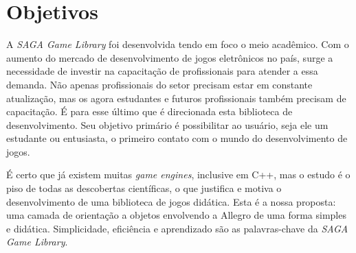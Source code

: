 \section{Objetivos}
\label{section:objetivos}
%
A \textit{SAGA Game Library} foi desenvolvida tendo em foco o meio acadêmico. Com o aumento do mercado de desenvolvimento de 
jogos eletrônicos no país, surge a necessidade de investir na capacitação de profissionais para atender a essa demanda. Não apenas profissionais do setor precisam estar em constante atualização, mas os agora estudantes e futuros profissionais também precisam de capacitação. É para esse último que é direcionada esta biblioteca de desenvolvimento. Seu objetivo primário é possibilitar ao usuário, seja ele um estudante ou entusiasta, o primeiro contato com o mundo do desenvolvimento de jogos.
%
\par
%
É certo que já existem muitas \textit{game engines}, inclusive em C++, mas o estudo é o piso de todas as descobertas científicas, o que justifica e motiva o desenvolvimento de uma biblioteca de jogos didática. Esta é a nossa proposta: uma camada de orientação a objetos envolvendo a Allegro de uma forma simples e didática. Simplicidade, eficiência e aprendizado são as palavras-chave da \textit{SAGA Game Library}.
%
%
%